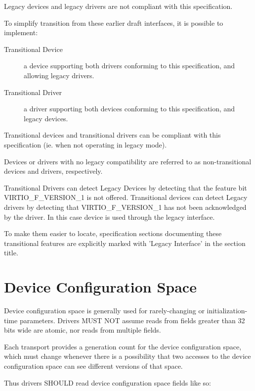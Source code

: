 Legacy devices and legacy drivers are not compliant with this
specification.

To simplify transition from these earlier draft interfaces,
it is possible to implement:

\begin{description}
\item[Transitional Device]
        a device supporting both drivers conforming to this
        specification, and allowing legacy drivers.

\item[Transitional Driver]
        a driver supporting both devices conforming to this
        specification, and legacy devices.
\end{description}

Transitional devices and transitional drivers can be compliant with
this specification (ie. when not operating in legacy mode).

Devices or drivers with no legacy compatibility are referred to as
non-transitional devices and drivers, respectively.

Transitional Drivers can detect Legacy Devices by detecting that
the feature bit VIRTIO_F_VERSION_1 is not offered.
Transitional devices can detect Legacy drivers by detecting that
VIRTIO_F_VERSION_1 has not been acknowledged by the driver.
In this case device is used through the legacy interface.

To make them easier to locate, specification sections documenting
these transitional features are explicitly marked with 'Legacy
Interface' in the section title.

\section{Device Configuration Space}\label{sec:Basic Facilities of a Virtio Device / Device Configuration Space}

Device configuration space is generally used for rarely-changing or
initialization-time parameters.  Drivers MUST NOT assume reads from
fields greater than 32 bits wide are atomic, nor reads from
multiple fields.

Each transport provides a generation count for the device configuration
space, which must change whenever there is a possibility that two
accesses to the device configuration space can see different versions of that
space.

Thus drivers SHOULD read device configuration space fields like so:

